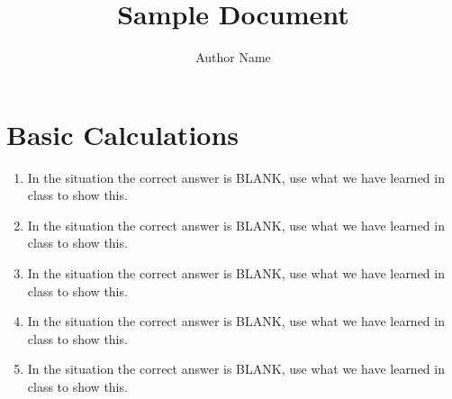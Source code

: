 \documentclass[12pt,twoside]{article}
\title{Sample Document}
\author{Author Name}
\begin{document}
\section*{Basic Calculations}
\begin{enumerate}
    \item In the situation the correct answer is BLANK, use what we have learned in class to show this.
    \item In the situation the correct answer is BLANK, use what we have learned in class to show this.
    \item In the situation the correct answer is BLANK, use what we have learned in class to show this.
    \item In the situation the correct answer is BLANK, use what we have learned in class to show this.
    \item In the situation the correct answer is BLANK, use what we have learned in class to show this.
\end{enumerate}


\clearpage
\end{document}
